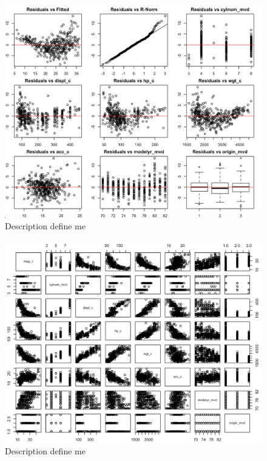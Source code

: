 \documentclass{article}
\begin{document}
\begin{figure}
	\centering
	\includegraphics[width=1\linewidth]{2-10p_resall}
	\caption[TOC Define Me]
	{Description define me}
\end{figure}

\clearpage
\newpage 

\begin{figure}
	\centering
	\includegraphics[width=1\linewidth]{1p_ScPlMtr}
	\caption[TOC Define Me]
	{Description define me}
\end{figure}

\clearpage
\newpage 
\end{document}
